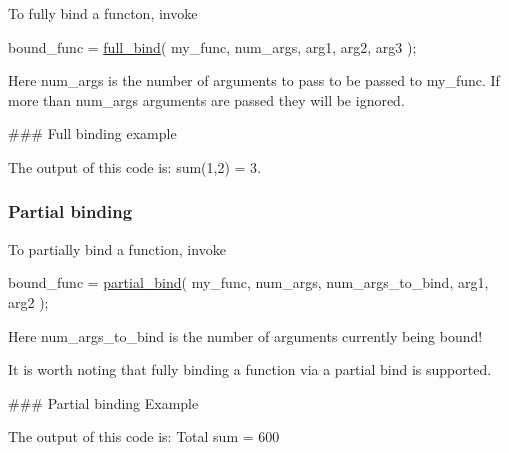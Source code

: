 To fully bind a functon, invoke 
\begin{DoxyCode}
bound\_func = \hyperlink{bind_8c_a31fdc3dfcbd70d3f32f4e3c8a2084c6a}{full\_bind}( my\_func, num\_args, arg1, arg2, arg3 );
\end{DoxyCode}
 Here {\ttfamily num\+\_\+args} is the number of arguments to pass to be passed to {\ttfamily my\+\_\+func}. If more than {\ttfamily num\+\_\+args} arguments are passed they will be ignored.

\#\#\# Full binding example 
 The output of this code is\+: {\ttfamily sum(1,2) = 3}.

\subsubsection*{Partial binding}

To partially bind a function, invoke 
\begin{DoxyCode}
bound\_func = \hyperlink{bind_8c_a187e674be73b611c4e8d97345192757a}{partial\_bind}( my\_func, num\_args, num\_args\_to\_bind, arg1, arg2 );
\end{DoxyCode}
 Here {\ttfamily num\+\_\+args\+\_\+to\+\_\+bind} is the number of arguments currently being bound!

It is worth noting that fully binding a function via a partial bind is supported.

\#\#\# Partial binding Example 
 The output of this code is\+: {\ttfamily Total sum = 600}

